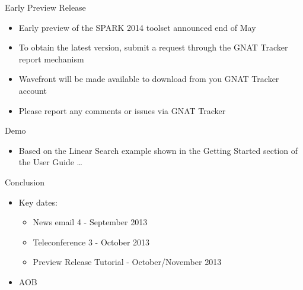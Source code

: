 \documentclass{beamer}
\begin{document}
\begin{frame}{Early Preview Release}

  \begin{itemize}
  \item Early preview of the SPARK 2014 toolset announced end of May
  \item To obtain the latest version, submit a request through the GNAT Tracker report mechanism
  \item Wavefront will be made available to download from you GNAT Tracker account
  \item Please report any comments or issues via GNAT Tracker
  \end{itemize}
 
\end{frame}

\begin{frame}{Demo}

  \begin{itemize}
  \item Based on the Linear Search example shown in the Getting Started section of the User Guide \ldots
  \end{itemize}
 
\end{frame}

\begin{frame}{Conclusion}

  \begin{itemize}

  \item Key dates: 
    \begin{itemize}
    \item News email 4 - September 2013
    \item Teleconference 3 - October 2013
    \item Preview Release Tutorial - October/November 2013
    \end{itemize}

  \item AOB

  \end{itemize}

\end{frame}
\end{document}
